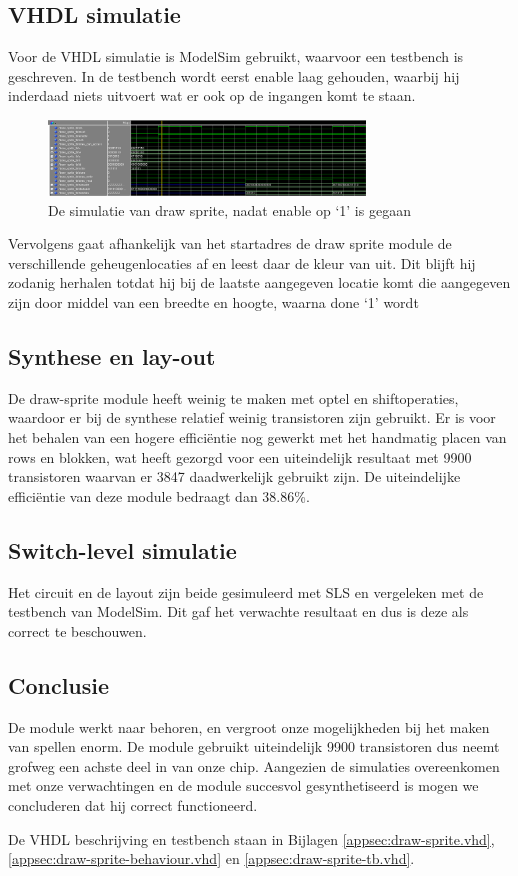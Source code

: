 \documentclass{scrartcl} %
\begin{document}
\subsection{VHDL simulatie}
Voor de VHDL simulatie is ModelSim gebruikt, waarvoor een testbench is geschreven. In de testbench wordt eerst enable laag gehouden, waarbij hij inderdaad niets uitvoert wat er ook op de ingangen komt te staan.\\
\begin{figure}[H]
	\centering
	\includegraphics[width=0.75\textwidth]{resource/draw_sprite_simulate.png}
	\caption{De simulatie van draw sprite, nadat enable op `1' is gegaan}
	\label{fig:draw-sprite-simulatie}
\end{figure}
Vervolgens gaat afhankelijk van het startadres de draw sprite module de verschillende geheugenlocaties af en leest daar de kleur van uit. Dit blijft hij zodanig herhalen totdat hij bij de laatste aangegeven locatie komt die aangegeven zijn door middel van een breedte en hoogte, waarna done `1' wordt

\subsection{Synthese en lay-out}
De draw-sprite module heeft weinig te maken met optel en shiftoperaties, waardoor er bij de synthese relatief weinig transistoren zijn gebruikt. Er is voor het behalen van een hogere efficiëntie nog gewerkt met het handmatig placen van rows en blokken, wat heeft gezorgd voor een uiteindelijk resultaat met 9900 transistoren waarvan er 3847 daadwerkelijk gebruikt zijn. De uiteindelijke efficiëntie van deze module bedraagt dan 38.86\%.

\subsection{Switch-level simulatie}
Het circuit en de layout zijn beide gesimuleerd met SLS en vergeleken met de testbench van ModelSim. Dit gaf het verwachte resultaat en dus is deze als correct te beschouwen.

\subsection{Conclusie}
De module werkt naar behoren, en vergroot onze mogelijkheden bij het maken van spellen enorm. De module gebruikt uiteindelijk 9900 transistoren dus neemt grofweg een achste deel in van onze chip. Aangezien de simulaties overeenkomen met onze verwachtingen en de module succesvol gesynthetiseerd is mogen we concluderen dat hij correct functioneerd.

De VHDL beschrijving en testbench staan in Bijlagen \ref{appsec:draw-sprite.vhd}, \ref{appsec:draw-sprite-behaviour.vhd} en \ref{appsec:draw-sprite-tb.vhd}.
\end{document}
